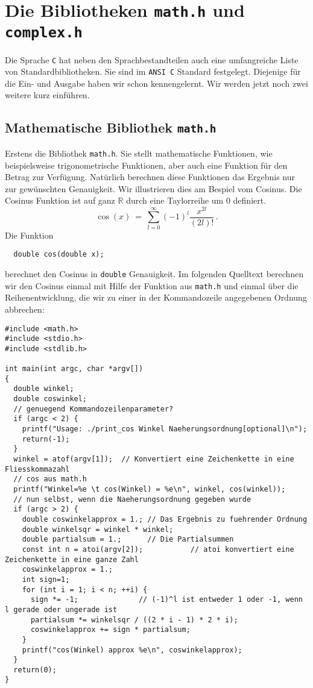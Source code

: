 \section{Die Bibliotheken \texttt{math.h} und \texttt{complex.h}}

Die Sprache \texttt{C} hat neben den Sprachbestandteilen auch eine umfangreiche Liste von Standardbibliotheken.
Sie sind im \texttt{ANSI C} Standard festgelegt.
Diejenige für die Ein- und Ausgabe haben wir schon kennengelernt.
Wir werden jetzt noch zwei weitere kurz einführen.

\subsection{Mathematische Bibliothek \texttt{math.h}}

Erstens die Bibliothek \texttt{math.h}.
Sie stellt mathematische Funktionen, wie beispielsweise trigonometrische Funktionen, aber auch eine Funktion für den Betrag zur Verfügung.
Natürlich berechnen diese Funktionen das Ergebnis nur zur gewünschten Genauigkeit.
Wir illustrieren dies am Bespiel vom Cosinus.
Die Cosinus Funktion ist auf ganz $\mathbb{R}$ durch eine Taylorreihe um 0 definiert.
\begin{equation}
  \label{eq:cos}
  \cos\left(x\right)\ =\ \sum_{l=0}^{\infty} \left(-1\right)^{l} \dfrac{x^{2l}}{\left(2l\right)!}\,.
\end{equation}
Die Funktion 
\begin{lstlisting}
  double cos(double x);
\end{lstlisting}
berechnet den Cosinus in \texttt{double} Genauigkeit.
Im folgenden Quelltext berechnen wir den Cosinus einmal mit Hilfe der Funktion aus \texttt{math.h} und einmal über die Reihenentwicklung, die wir zu einer in der Kommandozeile angegebenen Ordnung abbrechen:
\begin{lstlisting}[caption={Beispiel zur Verwendung des Cosinus}, belowcaptionskip=0.3em]
#include <math.h>
#include <stdio.h>
#include <stdlib.h>

int main(int argc, char *argv[])
{
  double winkel;
  double coswinkel;
  // genuegend Kommandozeilenparameter?
  if (argc < 2) {
    printf("Usage: ./print_cos Winkel Naeherungsordnung[optional]\n");
    return(-1);
  }
  winkel = atof(argv[1]);  // Konvertiert eine Zeichenkette in eine Fliesskommazahl
  // cos aus math.h
  printf("Winkel=%e \t cos(Winkel) = %e\n", winkel, cos(winkel));
  // nun selbst, wenn die Naeherungsordnung gegeben wurde
  if (argc > 2) {
    double coswinkelapprox = 1.; // Das Ergebnis zu fuehrender Ordnung
    double winkelsqr = winkel * winkel;
    double partialsum = 1.;      // Die Partialsummen
    const int n = atoi(argv[2]);           // atoi konvertiert eine Zeichenkette in eine ganze Zahl
    coswinkelapprox = 1.;
    int sign=1;
    for (int i = 1; i < n; ++i) {
      sign *= -1;              // (-1)^l ist entweder 1 oder -1, wenn l gerade oder ungerade ist
      partialsum *= winkelsqr / ((2 * i - 1) * 2 * i);
      coswinkelapprox += sign * partialsum;
    }
    printf("cos(Winkel) approx %e\n", coswinkelapprox);
  }
  return(0);
}
\end{lstlisting}
